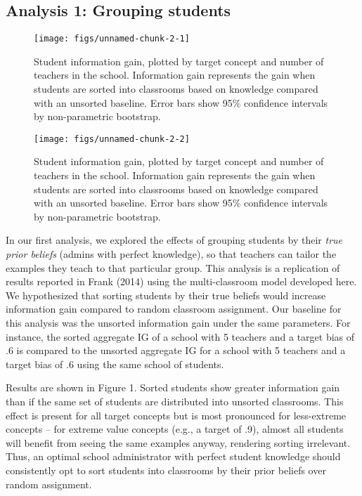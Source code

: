 \documentclass[10pt, letterpaper]{article}
\newenvironment{CodeChunk}{}{}
\begin{document}
\subsection{Analysis 1: Grouping
students}\label{analysis-1-grouping-students}

\begin{CodeChunk}
\begin{figure}[t]
\texttt{[image: figs/unnamed-chunk-2-1]} \caption[Student information gain, plotted by target concept and number of teachers in the school]{Student information gain, plotted by target concept and number of teachers in the school. Information gain represents the gain when students are sorted into classrooms based on knowledge compared with an unsorted baseline. Error bars show 95\% confidence intervals by non-parametric bootstrap.}\label{fig:unnamed-chunk-21}
\end{figure}
\begin{figure}[t]
\texttt{[image: figs/unnamed-chunk-2-2]} \caption[Student information gain, plotted by target concept and number of teachers in the school]{Student information gain, plotted by target concept and number of teachers in the school. Information gain represents the gain when students are sorted into classrooms based on knowledge compared with an unsorted baseline. Error bars show 95\% confidence intervals by non-parametric bootstrap.}\label{fig:unnamed-chunk-22}
\end{figure}
\end{CodeChunk}

In our first analysis, we explored the effects of grouping students by
their \emph{true prior beliefs} (admins with perfect knowledge), so that
teachers can tailor the examples they teach to that particular group.
This analysis is a replication of results reported in Frank (2014) using
the multi-classroom model developed here. We hypothesized that sorting
students by their true beliefs would increase information gain compared
to random classroom assignment. Our baseline for this analysis was the
unsorted information gain under the same parameters. For instance, the
sorted aggregate IG of a school with 5 teachers and a target bias of .6
is compared to the unsorted aggregate IG for a school with 5 teachers
and a target bias of .6 using the same school of students.

Results are shown in Figure 1. Sorted students show greater information
gain than if the same set of students are distributed into unsorted
classrooms. This effect is present for all target concepts but is most
pronounced for less-extreme concepts -- for extreme value concepts
(e.g., a target of .9), almost all students will benefit from seeing the
same examples anyway, rendering sorting irrelevant. Thus, an optimal
school administrator with perfect student knowledge should consistently
opt to sort students into classrooms by their prior beliefs over random
assignment.
\end{document}
